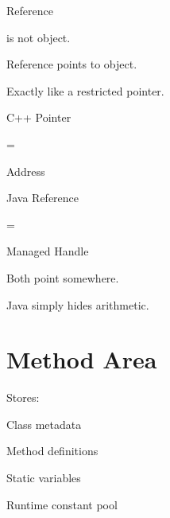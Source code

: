 \documentclass[11pt,a4paper]{book}
\begin{document}
Reference

is not object.


Reference points to object.


Exactly like a restricted pointer.


\begin{mentalmodel}

C++ Pointer

=

Address


Java Reference

=

Managed Handle


Both point somewhere.


Java simply hides arithmetic.

\end{mentalmodel}

\section{Method Area}

Stores:


Class metadata


Method definitions


Static variables


Runtime constant pool

\end{document}
